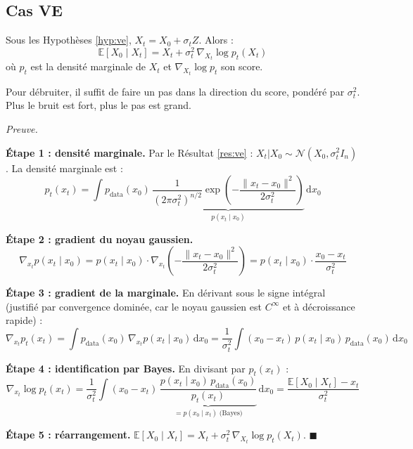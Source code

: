 \documentclass[12pt]{article}
\renewcommand{\qedsymbol}{$\blacksquare$}
\renewenvironment{proof}[1][\proofname]{%
  \par\medskip\noindent
  \textit{\color{proofgray}#1.}\enspace\ignorespaces
}{\hfill\qedsymbol\par\medskip}
\renewcommand{\proofname}{Preuve}
\begin{document}
\subsection{Cas VE}

\begin{resultbox}
\label{thm:tweedie_ve}
Sous les Hypothèses \ref{hyp:ve}, $X_t = X_0 + \sigma_t Z$. Alors :
\begin{equation}
    \boxed{\mathbb{E}[X_0 \mid X_t] = X_t + \sigma_t^2\, \nabla_{X_t} \log p_t(X_t)}
    \label{eq:tweedie_ve}
\end{equation}
où $p_t$ est la densité marginale de $X_t$ et $\nabla_{X_t} \log p_t$ son score.
\end{resultbox}

Pour débruiter, il suffit de faire un pas dans la direction du score, pondéré par $\sigma_t^2$. Plus le bruit est fort, plus le pas est grand.

  \begin{proof}







\textbf{Étape 1 : densité marginale.} Par le Résultat \ref{res:ve} : $X_t | X_0 \sim \mathcal{N}(X_0, \sigma_t^2 I_n)$. La densité marginale est :
\[
p_t(x_t) = \int p_{\text{data}}(x_0)\, \underbrace{\frac{1}{(2\pi\sigma_t^2)^{n/2}} \exp\!\left(-\frac{\|x_t - x_0\|^2}{2\sigma_t^2}\right)}_{p(x_t \mid x_0)}\, \mathrm{d}x_0
\]

\textbf{Étape 2 : gradient du noyau gaussien.}
\[
\nabla_{x_t} p(x_t \mid x_0) = p(x_t \mid x_0) \cdot \nabla_{x_t}\!\left(-\frac{\|x_t - x_0\|^2}{2\sigma_t^2}\right) = p(x_t \mid x_0) \cdot \frac{x_0 - x_t}{\sigma_t^2}
\]

\textbf{Étape 3 : gradient de la marginale.} En dérivant sous le signe intégral (justifié par convergence dominée, car le noyau gaussien est $C^\infty$ et à décroissance rapide) :
\[
\nabla_{x_t} p_t(x_t) = \int p_{\text{data}}(x_0)\, \nabla_{x_t} p(x_t \mid x_0)\, \mathrm{d}x_0 = \frac{1}{\sigma_t^2} \int (x_0 - x_t)\, p(x_t \mid x_0)\, p_{\text{data}}(x_0)\, \mathrm{d}x_0
\]

\textbf{Étape 4 : identification par Bayes.} En divisant par $p_t(x_t)$ :
\[
\nabla_{x_t} \log p_t(x_t) = \frac{1}{\sigma_t^2} \int (x_0 - x_t)\, \underbrace{\frac{p(x_t \mid x_0)\, p_{\text{data}}(x_0)}{p_t(x_t)}}_{= p(x_0 \mid x_t) \;\text{(Bayes)}}\, \mathrm{d}x_0 = \frac{\mathbb{E}[X_0 \mid X_t] - x_t}{\sigma_t^2}
\]

\textbf{Étape 5 : réarrangement.} $\mathbb{E}[X_0 \mid X_t] = X_t + \sigma_t^2\, \nabla_{X_t} \log p_t(X_t)$.
\end{proof}
\end{document}
